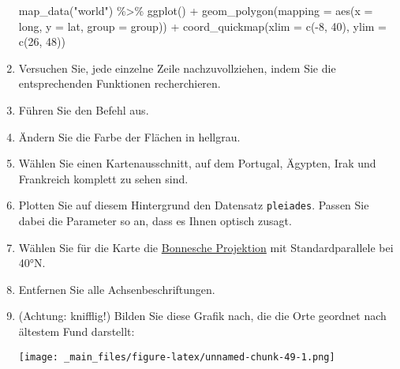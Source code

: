 \documentclass[11pt,german,a4paper]{article}
\newenvironment{Shaded}{\begin{snugshade}}{\end{snugshade}}
\newcommand{\AttributeTok}[1]{\textcolor[rgb]{0.77,0.63,0.00}{#1}}
\newcommand{\DecValTok}[1]{\textcolor[rgb]{0.00,0.00,0.81}{#1}}
\newcommand{\FunctionTok}[1]{\textcolor[rgb]{0.00,0.00,0.00}{#1}}
\newcommand{\NormalTok}[1]{#1}
\newcommand{\SpecialCharTok}[1]{\textcolor[rgb]{0.00,0.00,0.00}{#1}}
\newcommand{\StringTok}[1]{\textcolor[rgb]{0.31,0.60,0.02}{#1}}
\begin{document}
\begin{enumerate}
\begin{Shaded}
\begin{Highlighting}[]
\FunctionTok{map\_data}\NormalTok{(}\StringTok{"world"}\NormalTok{) }\SpecialCharTok{\%\textgreater{}\%}
  \FunctionTok{ggplot}\NormalTok{() }\SpecialCharTok{+}
    \FunctionTok{geom\_polygon}\NormalTok{(}\AttributeTok{mapping =} \FunctionTok{aes}\NormalTok{(}\AttributeTok{x =}\NormalTok{ long,}
                               \AttributeTok{y =}\NormalTok{ lat,}
                               \AttributeTok{group =}\NormalTok{ group)) }\SpecialCharTok{+}
    \FunctionTok{coord\_quickmap}\NormalTok{(}\AttributeTok{xlim =} \FunctionTok{c}\NormalTok{(}\SpecialCharTok{{-}}\DecValTok{8}\NormalTok{, }\DecValTok{40}\NormalTok{),}
                   \AttributeTok{ylim =} \FunctionTok{c}\NormalTok{(}\DecValTok{26}\NormalTok{, }\DecValTok{48}\NormalTok{))}
\end{Highlighting}
\end{Shaded}
\item
  Versuchen Sie, jede einzelne Zeile nachzuvollziehen, indem Sie die entsprechenden Funktionen recherchieren.
\item
  Führen Sie den Befehl aus.
\item
  Ändern Sie die Farbe der Flächen in hellgrau.
\item
  Wählen Sie einen Kartenausschnitt, auf dem Portugal, Ägypten, Irak und Frankreich komplett zu sehen sind.
\item
  Plotten Sie auf diesem Hintergrund den Datensatz \texttt{pleiades}. Passen Sie dabei die Parameter so an, dass es Ihnen optisch zusagt.
\item
  Wählen Sie für die Karte die \href{https://de.wikipedia.org/wiki/Bonnesche_Projektion}{Bonnesche Projektion} mit Standardparallele bei 40°N.
\item
  Entfernen Sie alle Achsenbeschriftungen.
\item
  (Achtung: knifflig!) Bilden Sie diese Grafik nach, die die Orte geordnet nach ältestem Fund darstellt:

  \texttt{[image: \_main\_files/figure-latex/unnamed-chunk-49-1.png]}
\end{enumerate}
\end{document}
